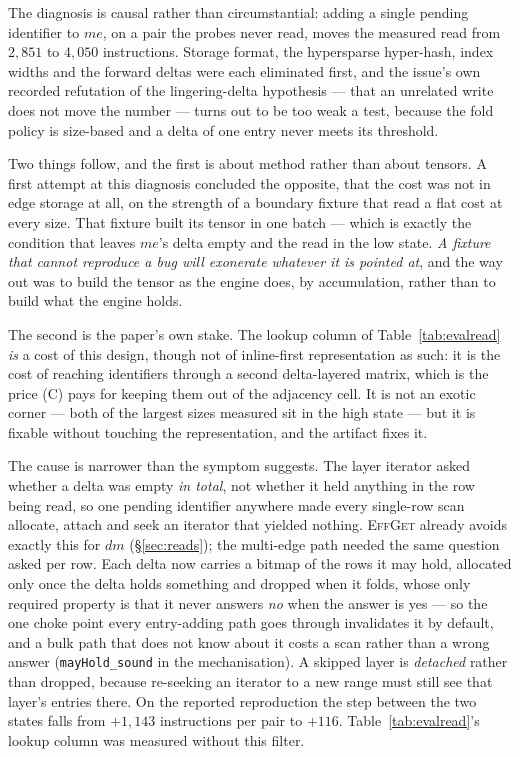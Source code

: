 \documentclass[11pt,a4paper]{article}
\theoremstyle{plain}
\theoremstyle{definition}
\theoremstyle{remark}
\begin{document}
The diagnosis is causal rather than circumstantial: adding a single pending
identifier to $me$, on a pair the probes never read, moves the measured read from
$2{,}851$ to $4{,}050$ instructions. Storage format, the hypersparse hyper-hash,
index widths and the forward deltas were each eliminated first, and the issue's
own recorded refutation of the lingering-delta hypothesis --- that an unrelated
write does not move the number --- turns out to be too weak a test, because the
fold policy is size-based and a delta of one entry never meets its threshold.

Two things follow, and the first is about method rather than about tensors. A
first attempt at this diagnosis concluded the opposite, that the cost was not
in edge storage at all, on the strength of a boundary fixture that read a flat
cost at every size. That fixture built its tensor in one batch --- which is
exactly the condition that leaves $me$'s delta empty and the read in the low
state. \emph{A fixture that cannot reproduce a bug will exonerate whatever it is
pointed at}, and the way out was to build the tensor as the engine does, by
accumulation, rather than to build what the engine holds.

The second is the paper's own stake. The lookup column of
Table~\ref{tab:evalread} \emph{is} a cost of this design, though not of
inline-first representation as such: it is the cost of reaching identifiers
through a second delta-layered matrix, which is the price (C) pays for keeping
them out of the adjacency cell. It is not an exotic corner --- both of the
largest sizes measured sit in the high state --- but it is fixable without
touching the representation, and the artifact fixes it.

The cause is narrower than the symptom suggests. The layer iterator asked
whether a delta was empty \emph{in total}, not whether it held anything in the
row being read, so one pending identifier anywhere made every single-row scan
allocate, attach and seek an iterator that yielded nothing. \textsc{EffGet}
already avoids exactly this for $dm$ (\S\ref{sec:reads}); the multi-edge path
needed the same question asked per row. Each delta now carries a bitmap of the
rows it may hold, allocated only once the delta holds something and dropped when
it folds, whose only required property is that it never answers \emph{no} when
the answer is yes --- so the one choke point every entry-adding path goes
through invalidates it by default, and a bulk path that does not know about it
costs a scan rather than a wrong answer (\texttt{mayHold\_sound} in the
mechanisation). A skipped layer is \emph{detached} rather than dropped, because
re-seeking an iterator to a new range must still see that layer's entries
there. On the reported reproduction the step between the two states falls from
$+1{,}143$ instructions per pair to $+116$. Table~\ref{tab:evalread}'s lookup
column was measured without this filter.
\end{document}
